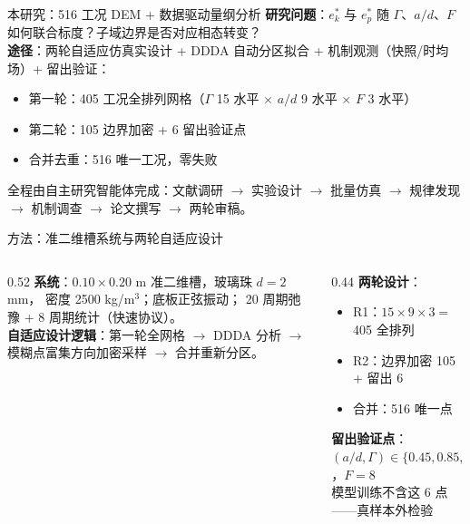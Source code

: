 \documentclass[aspectratio=169,10pt]{beamer}
\newcommand{\pos}[1]{\textcolor{positive}{#1}}
\newcommand{\con}[1]{\textcolor{negative}{#1}}
\newcommand{\HL}[1]{\textcolor{emphasis}{#1}}
\begin{document}
\begin{frame}{本研究：516 工况 DEM + 数据驱动量纲分析}
\textbf{研究问题}：$e_k^*$ 与 $e_p^*$ 随 $\Gamma$、$a/d$、$F$
如何联合标度？子域边界是否对应相态转变？\\[0.5em]

\textbf{途径}：两轮自适应仿真实设计 + DDDA 自动分区拟合 +
机制观测（快照/时均场）+ 留出验证：
\begin{itemize}
\item 第一轮：405 工况全排列网格（$\Gamma$ 15 水平 $\times$ $a/d$ 9 水平 $\times$ $F$ 3 水平）
\item 第二轮：105 边界加密 + \con{6 留出验证点}
\item 合并去重：\pos{516 唯一工况}，零失败
\end{itemize}
\medskip
全程由自主研究智能体完成：文献调研 $\to$ 实验设计 $\to$ 批量仿真 $\to$
规律发现 $\to$ 机制调查 $\to$ 论文撰写 $\to$ 两轮审稿。
\end{frame}

\begin{frame}{方法：准二维槽系统与两轮自适应设计}
\begin{columns}[T]
\begin{column}{0.52\textwidth}
\textbf{系统}：$0.10\times0.20$ m 准二维槽，玻璃珠 $d=2$ mm，
密度 2500 kg/m$^3$；底板正弦振动；
20 周期弛豫 + 8 周期统计（快速协议）。\\[0.4em]
\textbf{自适应设计逻辑}：第一轮全网格 $\to$ DDDA 分析 $\to$
\HL{模糊点富集方向}加密采样 $\to$ 合并重新分区。
\end{column}
\begin{column}{0.44\textwidth}
\textbf{两轮设计}：
\begin{itemize}
\item R1：$15\times9\times3=$ \pos{405} 全排列
\item R2：边界加密 \con{105} + 留出 \con{6}
\item 合并：\pos{516} 唯一点
\end{itemize}
\textbf{留出验证点}：$(a/d,\Gamma)\in\{0.45,0.85,1.5\}\times\{4,15\}$，$F=8$\\[0.3em]
{\small 模型训练不含这 6 点——真样本外检验}
\end{column}
\end{columns}
\end{frame}
\end{document}
